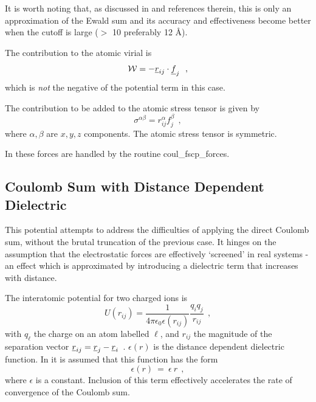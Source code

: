 It is worth noting that, as discussed in \cite{fennell-06a} and
references therein, this is only an approximation of the Ewald
sum and its accuracy and effectiveness become better when the
cutoff is large ($>$ 10 preferably 12 \AA).

The contribution to the atomic virial is
\begin{equation}
{\cal W} = -\mbox{$\underline{r}$}_{ij} \cdot \mbox{$\underline{f}$}_{j}~~,
\end{equation}
which is {\em not} the negative of the potential term in this case.

The contribution to be added to the atomic stress
tensor is given by
\begin{equation}
\sigma^{\alpha \beta} = r_{ij}^{\alpha} f_{j}^{\beta}~~,
\end{equation}
where $\alpha,\beta$ are $x,y,z$ components.  The atomic stress
tensor is symmetric.

In \D these forces are handled by the routine {\sc coul\_fscp\_forces}.

\subsection{Coulomb Sum with Distance Dependent Dielectric}

This potential attempts to address the difficulties of applying
the direct Coulomb sum, without the
brutal truncation of the previous case.  It hinges on the
assumption that the electrostatic forces are effectively
`screened' in real systems - an effect which is approximated by
introducing a dielectric term that increases with distance.

The interatomic potential for two charged ions is
\begin{equation}
U(r_{ij}) = \frac{1}{4\pi\epsilon_{0}\epsilon(r_{ij})} \frac{q_{i}q_{j}}{r_{ij}}~~,
\end{equation}
with $q_{\ell}$ the charge on an atom labelled $\ell$, and
$r_{ij}$ the magnitude of the separation vector
$\mbox{$\underline{r}$}_{ij}=\mbox{$\underline{r}$}_{j}-\mbox{$\underline{r}$}_{i}$~.  $\epsilon(r)$ is the
distance dependent dielectric
function.  In \D it is assumed that this function has the form
\begin{equation}
\epsilon(r)~=~\epsilon~r~~,
\end{equation}
where $\epsilon$ is a constant.  Inclusion of this term
effectively accelerates the rate of convergence of the Coulomb
sum.

